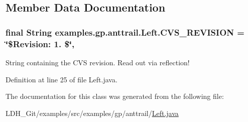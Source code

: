\subsection{Member Data Documentation}
\hypertarget{classexamples_1_1gp_1_1anttrail_1_1_left_a919561346e1d7dff16bb3d0b68e06083}{
\subsubsection[{C\-V\-S\-\_\-\-R\-E\-V\-I\-S\-I\-O\-N}]{\setlength{\rightskip}{0pt plus 5cm}final String examples.\-gp.\-anttrail.\-Left.\-C\-V\-S\-\_\-\-R\-E\-V\-I\-S\-I\-O\-N = \char`\"{}\$Revision\-: 1. \$\char`\"{}\hspace{0.3cm}{\ttfamily [static]}, {\ttfamily [private]}}}\label{classexamples_1_1gp_1_1anttrail_1_1_left_a919561346e1d7dff16bb3d0b68e06083}
String containing the C\-V\-S revision. Read out via reflection! 

Definition at line 25 of file Left.\-java.



The documentation for this class was generated from the following file\-:\begin{DoxyCompactItemize}
\item 
L\-D\-H\-\_\-\-Git/examples/src/examples/gp/anttrail/\hyperlink{_left_8java}{Left.\-java}\end{DoxyCompactItemize}
